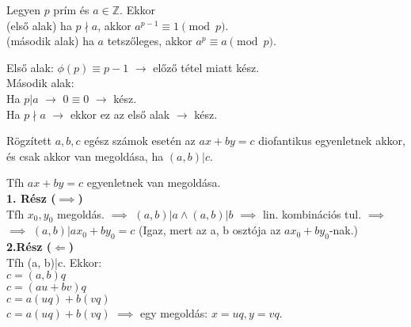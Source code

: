 \documentclass{beamer}
\begin{document}
\begin{frame}
\begin{tcolorbox}[title={Tétel: (Kis) Fermat tétel}]
Legyen $p$ prím és $a \in \mathbb{Z}$. Ekkor\\
(első alak) ha $p \nmid a$, akkor $a^{p-1} \equiv 1 \pmod{p}$.\\
(második alak) ha $a$ tetszőleges, akkor $a^p \equiv a \pmod{p}$.

\end{tcolorbox}

\begin{tcolorbox}[title={Bizonyítás}]
Első alak: ${\phi}(p) \equiv p - 1$ $\rightarrow$ előző tétel miatt kész.\\
\bigskip
Második alak:\\
Ha $p|a$ $\rightarrow$ $0 \equiv 0$ $\rightarrow$ kész.\\
Ha $p{\nmid}a$ $\rightarrow$ ekkor ez az első alak $\rightarrow$ kész.

\end{tcolorbox}
\end{frame}

\begin{frame}
\begin{tcolorbox}[title={Tétel: A diofantikus egyenlet megoldása}]
Rögzített $a, b, c$ egész számok esetén az \textbf{$ax + by = c$} diofantikus egyenletnek akkor, és csak akkor van megoldása, ha $(a, b)|c$.
\end{tcolorbox}

\begin{tcolorbox}[title={Bizonyítás}]
Tfh $ax + by = c$ egyenletnek van megoldása.\\
\textbf{1. Rész ($\implies$)}\\
\smallskip
Tfh $x_0, y_0$ megoldás. $\implies$ $(a, b)|a \land (a, b)|b$ $\implies$ lin. kombinációs tul. $\implies$\\
$\implies$ $(a, b)|ax_0 + by_0 = c$ (Igaz, mert az a, b osztója az $ax_0 + by_0$-nak.)\\
\bigskip
\textbf{2.Rész ($\Longleftarrow$)}\\
\smallskip
Tfh (a, b)|c. Ekkor:\\
$c = (a, b)q$\\
$c = (au + bv)q$\\
$c = a(uq) + b(vq)$\\
$c = a(uq) + b(vq)$ $\implies$ egy megoldás: $x = uq, y = vq$.\\
\end{tcolorbox}
\end{frame}
\end{document}

